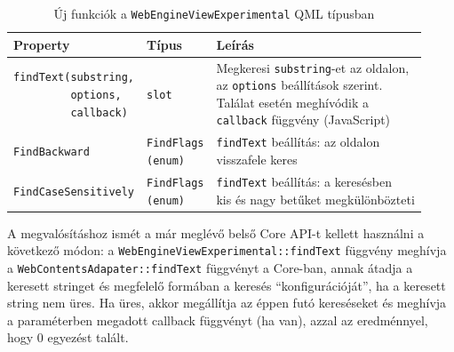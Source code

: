 \documentclass[12pt]{report}
\begin{document}
\begin{table}[ht]
    \centering
    \begin{tabular}[t]{ | l | l | p{188pt} | }
        \hline
        \textbf{Property} & \textbf{Típus} & \textbf{Leírás} \\ \hline

        \makecell[l]{\texttt{findText(substring,} \\
                     \texttt{~~~~~~~~~options,} \\
                     \texttt{~~~~~~~~~callback)}} & \texttt{slot} &
        \makecell[l]{Megkeresi \texttt{substring}-et az oldalon, \\
                     az \texttt{options} beállítások szerint. \\
                     Találat esetén meghívódik a \\
                     \texttt{callback} függvény (JavaScript)}
        \\ \hline

        \texttt{FindBackward} & \makecell[l]{\texttt{FindFlags} \\ \texttt{(enum)}} &
        \makecell[l]{\texttt{findText} beállítás: az oldalon \\
                     visszafele keres}
        \\ \hline

        \texttt{FindCaseSensitively} & \makecell[l]{\texttt{FindFlags} \\ \texttt{(enum)}} &
        \makecell[l]{\texttt{findText} beállítás: a keresésben \\
                     kis és nagy betűket megkülönbözteti}
        \\ \hline
    \end{tabular}
    \caption{
        \label{tab:find-text-api}
        Új funkciók a \texttt{WebEngineViewExperimental} QML típusban
    }
\end{table}

A megvalósításhoz ismét a már meglévő belső Core API-t kellett használni a következő módon:
a \texttt{WebEngineViewExperimental::findText} függvény meghívja
a \texttt{WebContentsAdapater::findText} függvényt a Core-ban,
annak átadja a keresett stringet és megfelelő formában a keresés ``konfigurációját'',
ha a keresett string nem üres.
Ha üres, akkor megállítja az éppen futó kereséseket és meghívja a paraméterben
megadott callback függvényt (ha van), azzal az eredménnyel, hogy 0 egyezést talált.
\end{document}

